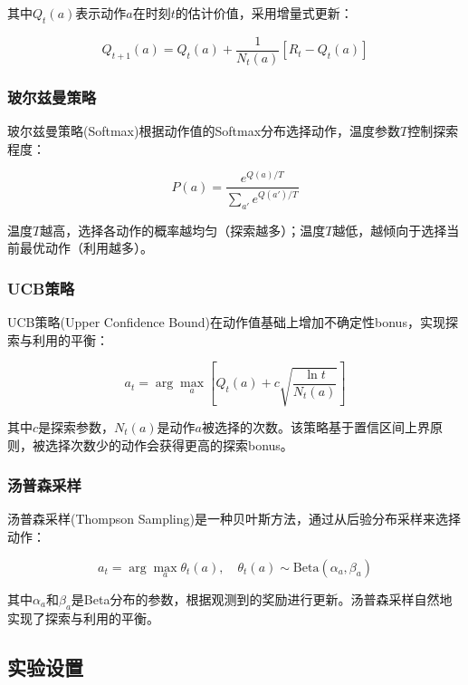 \documentclass[12pt,a4paper]{article}
\begin{document}
其中$Q_t(a)$表示动作$a$在时刻$t$的估计价值，采用增量式更新：

\begin{equation}
Q_{t+1}(a) = Q_t(a) + \frac{1}{N_t(a)}[R_t - Q_t(a)]
\end{equation}

\subsubsection{玻尔兹曼策略}

玻尔兹曼策略(Softmax)根据动作值的Softmax分布选择动作，温度参数$T$控制探索程度：

\begin{equation}
P(a) = \frac{e^{Q(a)/T}}{\sum_{a'} e^{Q(a')/T}}
\end{equation}

温度$T$越高，选择各动作的概率越均匀（探索越多）；温度$T$越低，越倾向于选择当前最优动作（利用越多）。

\subsubsection{UCB策略}

UCB策略(Upper Confidence Bound)在动作值基础上增加不确定性bonus，实现探索与利用的平衡：

\begin{equation}
a_t = \arg\max_a \left[ Q_t(a) + c\sqrt{\frac{\ln t}{N_t(a)}} \right]
\end{equation}

其中$c$是探索参数，$N_t(a)$是动作$a$被选择的次数。该策略基于置信区间上界原则，被选择次数少的动作会获得更高的探索bonus。

\subsubsection{汤普森采样}

汤普森采样(Thompson Sampling)是一种贝叶斯方法，通过从后验分布采样来选择动作：

\begin{equation}
a_t = \arg\max_a \theta_t(a), \quad \theta_t(a) \sim \text{Beta}(\alpha_a, \beta_a)
\end{equation}

其中$\alpha_a$和$\beta_a$是Beta分布的参数，根据观测到的奖励进行更新。汤普森采样自然地实现了探索与利用的平衡。

\subsection{实验设置}
\end{document}
